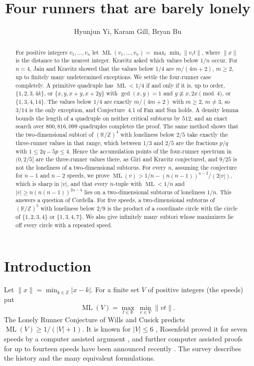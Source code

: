 \documentclass[12pt]{amsart}
\title{Four runners that are barely lonely}
\author[H. Yi et al.]{Hyunjun Yi, Karam Gill, Bryan Bu}
\theoremstyle{definition}\newtheorem{definition}[theorem]{Definition}
\theoremstyle{remark}\newtheorem{remark}[theorem]{Remark}
\newcommand{\Z}{\mathbb Z}\newcommand{\R}{\mathbb R}\newcommand{\T}{\mathbb T}
\newcommand{\norm}[1]{\lVert #1\rVert}
\newcommand{\ML}{\operatorname{ML}}
\begin{document}
\begin{abstract}
For positive integers $v_1,\dots,v_n$ let $\ML(v_1,\dots,v_n)=\max_t\min_i\norm{v_it}$, where $\norm{x}$ is the distance to the nearest integer. Kravitz asked which values below $1/n$ occur. For $n=4$, Jain and Kravitz showed that the values below $1/4$ are $m/(4m+2)$, $m\ge2$, up to finitely many undetermined exceptions. We settle the four-runner case completely. A primitive quadruple has $\ML<1/4$ if and only if it is, up to order, $\{1,2,3,4k\}$, or $\{x,y,x+y,x+2y\}$ with $\gcd(x,y)=1$ and $y\not\equiv x,2x\pmod 4$, or $\{1,3,4,14\}$. The values below $1/4$ are exactly $m/(4m+2)$ with $m\ge2$, $m\ne3$, so $3/14$ is the only exception, and Conjecture~4.1 of Fan and Sun holds. A density lemma bounds the length of a quadruple on neither critical subtorus by $512$, and an exact search over $800{,}816{,}099$ quadruples completes the proof. The same method shows that the two-dimensional subtori of $(\R/\Z)^4$ with loneliness below $2/5$ take exactly the three-runner values in that range, which between $1/3$ and $2/5$ are the fractions $p/q$ with $1\le 2q-5p\le 4$. Hence the accumulation points of the four-runner spectrum in $(0,2/5]$ are the three-runner values there, as Giri and Kravitz conjectured, and $9/25$ is not the loneliness of a two-dimensional subtorus. For every $n$, assuming the conjecture for $n-1$ and $n-2$ speeds, we prove $\ML(v)>1/n-(n(n-1))^{n-2}/(2|v|)$, which is sharp in $|v|$, and that every $n$-tuple with $\ML<1/n$ and $|v|\ge n(n(n-1))^{2n-4}$ lies on a two-dimensional subtorus of loneliness $1/n$. This answers a question of Cordella. For five speeds, a two-dimensional subtorus of $(\R/\Z)^5$ with loneliness below $2/9$ is the product of a coordinate circle with the circle of $\{1,2,3,4\}$ or $\{1,3,4,7\}$. We also give infinitely many subtori whose maximizers lie off every circle with a repeated speed.
\end{abstract}
\maketitle


\section{Introduction}
Let $\norm{x}=\min_{k\in\Z}|x-k|$. For a finite set $V$ of positive integers (the speeds) put
\[
 \ML(V)=\max_{t\in\R}\ \min_{v\in V}\norm{vt}.
\]
The Lonely Runner Conjecture of Wills \cite{Wills} and Cusick \cite{Cusick} predicts $\ML(V)\ge 1/(|V|+1)$. It is known for $|V|\le 6$ \cite{CusickPomerance,Chen,Bienia,BHK,BarajasSerra}, Rosenfeld proved it for seven speeds by a computer assisted argument \cite{Rosenfeld}, and further computer assisted proofs for up to fourteen speeds have been announced recently \cite{Trak,SungTrak,Allikvere}. The survey \cite{PerarnauSerra} describes the history and the many equivalent formulations.
\end{document}
